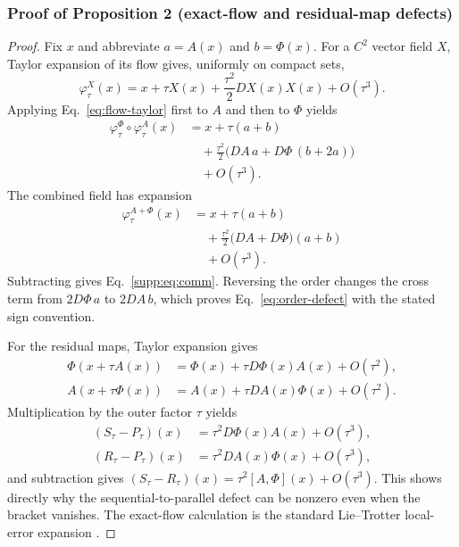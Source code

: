 \documentclass[11pt]{article}
\begin{document}
\subsubsection{Proof of Proposition 2 (exact-flow and residual-map defects)}
\begin{proof}
Fix $x$ and abbreviate $a=A(x)$ and $b=\Phi(x)$. For a $C^2$ vector field $X$,
Taylor expansion of its flow gives, uniformly on compact sets,
\begin{equation}
\varphi^X_\tau(x)
=x+\tau X(x)+\frac{\tau^2}{2}DX(x)X(x)+O(\tau^3).
\label{eq:flow-taylor}
\end{equation}
Applying Eq.~\eqref{eq:flow-taylor} first to $A$ and then to $\Phi$ yields
\begin{equation}
\begin{aligned}
\varphi^\Phi_\tau\circ\varphi^A_\tau(x)
&=x+\tau(a+b)\\
&\quad+\frac{\tau^2}{2}
\big(DA\,a+D\Phi\,(b+2a)\big)\\
&\quad+O(\tau^3).
\end{aligned}
\label{eq:composition-expansion}
\end{equation}
The combined field has expansion
\begin{equation}
\begin{aligned}
\varphi^{A+\Phi}_\tau(x)
&=x+\tau(a+b)\\
&\quad+\frac{\tau^2}{2}
\big(DA+D\Phi\big)(a+b)\\
&\quad+O(\tau^3).
\end{aligned}
\end{equation}
Subtracting gives Eq.~\eqref{supp:eq:comm}. Reversing the order changes the cross
term from $2D\Phi\,a$ to $2DA\,b$, which proves
Eq.~\eqref{eq:order-defect} with the stated sign convention.

For the residual maps, Taylor expansion gives
\begin{align}
\Phi(x+\tau A(x))
&=\Phi(x)+\tau D\Phi(x)A(x)+O(\tau^2),\\
A(x+\tau\Phi(x))
&=A(x)+\tau DA(x)\Phi(x)+O(\tau^2).
\end{align}
Multiplication by the outer factor $\tau$ yields
\begin{align}
(S_\tau-P_\tau)(x)&=\tau^2D\Phi(x)A(x)+O(\tau^3),\\
(R_\tau-P_\tau)(x)&=\tau^2DA(x)\Phi(x)+O(\tau^3),
\end{align}
and subtraction gives
$(S_\tau-R_\tau)(x)=\tau^2[A,\Phi](x)+O(\tau^3)$. This shows directly why the
sequential-to-parallel defect can be nonzero even when the bracket vanishes. The
exact-flow calculation is the standard Lie--Trotter local-error expansion
\citep{hairer2006geometric}.
\end{proof}
\end{document}
